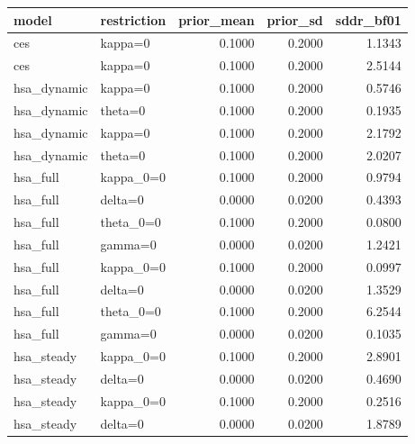 \begin{tabular}{llrrr}
\toprule
model & restriction & prior\_mean & prior\_sd & sddr\_bf01 \\
\midrule
ces & kappa=0 & 0.1000 & 0.2000 & 1.1343 \\
ces & kappa=0 & 0.1000 & 0.2000 & 2.5144 \\
hsa\_dynamic & kappa=0 & 0.1000 & 0.2000 & 0.5746 \\
hsa\_dynamic & theta=0 & 0.1000 & 0.2000 & 0.1935 \\
hsa\_dynamic & kappa=0 & 0.1000 & 0.2000 & 2.1792 \\
hsa\_dynamic & theta=0 & 0.1000 & 0.2000 & 2.0207 \\
hsa\_full & kappa\_0=0 & 0.1000 & 0.2000 & 0.9794 \\
hsa\_full & delta=0 & 0.0000 & 0.0200 & 0.4393 \\
hsa\_full & theta\_0=0 & 0.1000 & 0.2000 & 0.0800 \\
hsa\_full & gamma=0 & 0.0000 & 0.0200 & 1.2421 \\
hsa\_full & kappa\_0=0 & 0.1000 & 0.2000 & 0.0997 \\
hsa\_full & delta=0 & 0.0000 & 0.0200 & 1.3529 \\
hsa\_full & theta\_0=0 & 0.1000 & 0.2000 & 6.2544 \\
hsa\_full & gamma=0 & 0.0000 & 0.0200 & 0.1035 \\
hsa\_steady & kappa\_0=0 & 0.1000 & 0.2000 & 2.8901 \\
hsa\_steady & delta=0 & 0.0000 & 0.0200 & 0.4690 \\
hsa\_steady & kappa\_0=0 & 0.1000 & 0.2000 & 0.2516 \\
hsa\_steady & delta=0 & 0.0000 & 0.0200 & 1.8789 \\
\bottomrule
\end{tabular}

